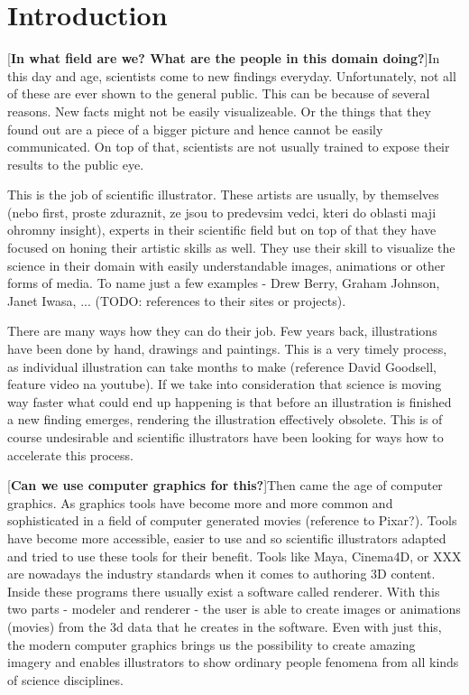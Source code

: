 \documentclass[
  digital, %
  table,   %
  nolof,     %
  nolot,     %
]{fithesis3}
\begin{document}
\chapter{Introduction}
[\textbf{In what field are we? What are the people in this domain doing?}]In this day and age, scientists come to new findings everyday. Unfortunately, not all of these are ever shown to the general public. This can be because of several reasons. New facts might not be easily visualizeable. Or the things that they found out are a piece of a bigger picture and hence cannot be easily communicated. On top of that, scientists are not usually trained to expose their results to the public eye.

This is the job of scientific illustrator. These artists are usually, by themselves (nebo first, proste zduraznit, ze jsou to predevsim vedci, kteri do oblasti maji ohromny insight), experts in their scientific field but on top of that they have focused on honing their artistic skills as well. They use their skill to visualize the science in their domain with easily understandable images, animations or other forms of media. To name just a few examples - Drew Berry, Graham Johnson, Janet Iwasa, ... (TODO: references to their sites or projects).

There are many ways how they can do their job. Few years back, illustrations have been done by hand, drawings and paintings. This is a very timely process, as individual illustration can take months to make (reference David Goodsell, feature video na youtube). If we take into consideration that science is moving way faster what could end up happening is that before an illustration is finished a new finding emerges, rendering the illustration effectively obsolete. This is of course undesirable and scientific illustrators have been looking for ways how to accelerate this process.

[\textbf{Can we use computer graphics for this?}]Then came the age of computer graphics. As graphics tools have become more and more common and sophisticated in a field of computer generated movies (reference to Pixar?). Tools have become more accessible, easier to use and so scientific illustrators adapted and tried to use these tools for their benefit. Tools like Maya, Cinema4D, or XXX are nowadays the industry standards when it comes to authoring 3D content. Inside these programs there usually exist a software called renderer. With this two parts - modeler and renderer - the user is able to create images or animations (movies) from the 3d data that he creates in the software.
Even with just this, the modern computer graphics brings us the possibility to create amazing imagery and enables illustrators to show ordinary people fenomena from all kinds of science disciplines.
\end{document}
